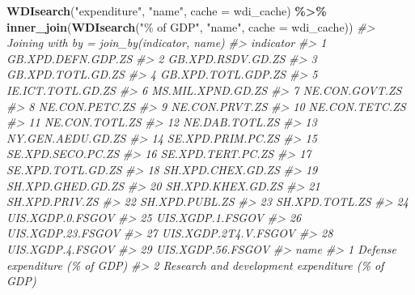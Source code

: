 \documentclass[
  xelatex, ja=standard]{bxjsbook}
\newenvironment{Shaded}{\begin{snugshade}}{\end{snugshade}}
\newcommand{\AttributeTok}[1]{\textcolor[rgb]{0.13,0.29,0.53}{#1}}
\newcommand{\CommentTok}[1]{\textcolor[rgb]{0.56,0.35,0.01}{\textit{#1}}}
\newcommand{\FunctionTok}[1]{\textcolor[rgb]{0.13,0.29,0.53}{\textbf{#1}}}
\newcommand{\NormalTok}[1]{#1}
\newcommand{\SpecialCharTok}[1]{\textcolor[rgb]{0.81,0.36,0.00}{\textbf{#1}}}
\newcommand{\StringTok}[1]{\textcolor[rgb]{0.31,0.60,0.02}{#1}}
\theoremstyle{definition}
\theoremstyle{definition}
\theoremstyle{definition}
\theoremstyle{definition}
\theoremstyle{remark}
\begin{document}
\begin{Shaded}
\begin{Highlighting}[]
\FunctionTok{WDIsearch}\NormalTok{(}\StringTok{"expenditure"}\NormalTok{, }\StringTok{"name"}\NormalTok{, }\AttributeTok{cache =}\NormalTok{ wdi\_cache) }\SpecialCharTok{\%\textgreater{}\%} 
  \FunctionTok{inner\_join}\NormalTok{(}\FunctionTok{WDIsearch}\NormalTok{(}\StringTok{"\% of GDP"}\NormalTok{, }\StringTok{"name"}\NormalTok{, }\AttributeTok{cache =}\NormalTok{ wdi\_cache))}
\CommentTok{\#\textgreater{} Joining with \textasciigrave{}by = join\_by(indicator, name)\textasciigrave{}}
\CommentTok{\#\textgreater{}               indicator}
\CommentTok{\#\textgreater{} 1    GB.XPD.DEFN.GDP.ZS}
\CommentTok{\#\textgreater{} 2     GB.XPD.RSDV.GD.ZS}
\CommentTok{\#\textgreater{} 3     GB.XPD.TOTL.GD.ZS}
\CommentTok{\#\textgreater{} 4    GB.XPD.TOTL.GDP.ZS}
\CommentTok{\#\textgreater{} 5     IE.ICT.TOTL.GD.ZS}
\CommentTok{\#\textgreater{} 6     MS.MIL.XPND.GD.ZS}
\CommentTok{\#\textgreater{} 7        NE.CON.GOVT.ZS}
\CommentTok{\#\textgreater{} 8        NE.CON.PETC.ZS}
\CommentTok{\#\textgreater{} 9        NE.CON.PRVT.ZS}
\CommentTok{\#\textgreater{} 10       NE.CON.TETC.ZS}
\CommentTok{\#\textgreater{} 11       NE.CON.TOTL.ZS}
\CommentTok{\#\textgreater{} 12       NE.DAB.TOTL.ZS}
\CommentTok{\#\textgreater{} 13    NY.GEN.AEDU.GD.ZS}
\CommentTok{\#\textgreater{} 14    SE.XPD.PRIM.PC.ZS}
\CommentTok{\#\textgreater{} 15    SE.XPD.SECO.PC.ZS}
\CommentTok{\#\textgreater{} 16    SE.XPD.TERT.PC.ZS}
\CommentTok{\#\textgreater{} 17    SE.XPD.TOTL.GD.ZS}
\CommentTok{\#\textgreater{} 18    SH.XPD.CHEX.GD.ZS}
\CommentTok{\#\textgreater{} 19    SH.XPD.GHED.GD.ZS}
\CommentTok{\#\textgreater{} 20    SH.XPD.KHEX.GD.ZS}
\CommentTok{\#\textgreater{} 21       SH.XPD.PRIV.ZS}
\CommentTok{\#\textgreater{} 22       SH.XPD.PUBL.ZS}
\CommentTok{\#\textgreater{} 23       SH.XPD.TOTL.ZS}
\CommentTok{\#\textgreater{} 24     UIS.XGDP.0.FSGOV}
\CommentTok{\#\textgreater{} 25     UIS.XGDP.1.FSGOV}
\CommentTok{\#\textgreater{} 26    UIS.XGDP.23.FSGOV}
\CommentTok{\#\textgreater{} 27 UIS.XGDP.2T4.V.FSGOV}
\CommentTok{\#\textgreater{} 28     UIS.XGDP.4.FSGOV}
\CommentTok{\#\textgreater{} 29    UIS.XGDP.56.FSGOV}
\CommentTok{\#\textgreater{}                                                                                                        name}
\CommentTok{\#\textgreater{} 1                                                                            Defense expenditure (\% of GDP)}
\CommentTok{\#\textgreater{} 2                                                           Research and development expenditure (\% of GDP)}

\end{Highlighting}
\end{Shaded}
\end{document}
